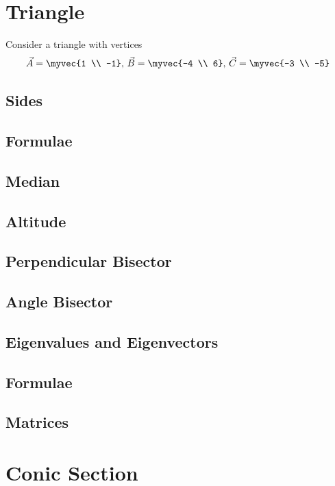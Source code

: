 \documentclass[journal]{IEEEtran}
\begin{document}
	\section{Triangle}
	Consider a triangle with vertices
	\begin{align}
		\label{eq:app-tri-pts}
		\vec{A} = \myvec{1 \\ -1},\,
		\vec{B} = \myvec{-4 \\ 6},\,
		\vec{C} = \myvec{-3 \\ -5}
	\end{align}
	\subsection{Sides}
	
	\subsection{Formulae}
	
	\subsection{Median}
	
	\subsection{Altitude}
	
	\subsection{Perpendicular Bisector}
	
	\subsection{Angle Bisector}
	
	\subsection{Eigenvalues and Eigenvectors}
	
	\subsection{Formulae}
	
	\subsection{Matrices}
	
	\newpage
	\section{Conic Section}
	
	\fi
\end{document}
